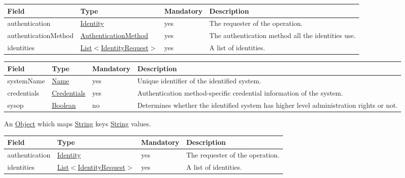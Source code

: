 \documentclass[a4paper]{arrowhead}
\newcommand{\pref}[1]{{\textcolor{ArrowheadGrey}{\hyperref[sec:model:primitives:#1]{#1}}}}
\begin{document}
\begin{table}[ht!]
\begin{tabularx}{\textwidth}{| p{3.3cm} | p{3.4cm} | p{2cm} | X |} \hline
\rowcolor{gray!33} Field & Type & Mandatory & Description \\ \hline
authentication & \hyperref[sec:model:Identity]{Identity} & yes & The requester of the operation. \\ \hline
authenticationMethod & \pref{AuthenticationMethod} & yes & The authentication method all the identities use. \\ \hline
identities & \pref{List}$<$\hyperref[sec:model:IdentityRequest]{IdentityRequest}$>$ & yes & A list of identities. \\ \hline
\end{tabularx}
\end{table}

\clearpage

 
\begin{table}[ht!]
\begin{tabularx}{\textwidth}{| p{2.5cm} | p{2.5cm} | p{2cm} | X |} \hline
\rowcolor{gray!33} Field & Type & Mandatory & Description \\ \hline
systemName & \pref{Name} & yes & Unique identifier of the identified system. \\ \hline
credentials &\hyperref[sec:model:Credentials]{Credentials} & yes & Authentication method-specific credential information of the system. \\ \hline
sysop & \pref{Boolean} & no & Determines whether the identified system has higher level administration rights or not. \\ \hline
\end{tabularx}
\end{table}


An \pref{Object} which maps \pref{String} keys \pref{String} values.

 
\begin{table}[ht!]
\begin{tabularx}{\textwidth}{| p{3.3cm} | p{3.4cm} | p{2cm} | X |} \hline
\rowcolor{gray!33} Field & Type & Mandatory & Description \\ \hline
authentication & \hyperref[sec:model:Identity]{Identity} & yes & The requester of the operation. \\ \hline
identities & \pref{List}$<$\hyperref[sec:model:IdentityRequest]{IdentityRequest}$>$ & yes & A list of identities. \\ \hline
\end{tabularx}
\end{table}
\end{document}
